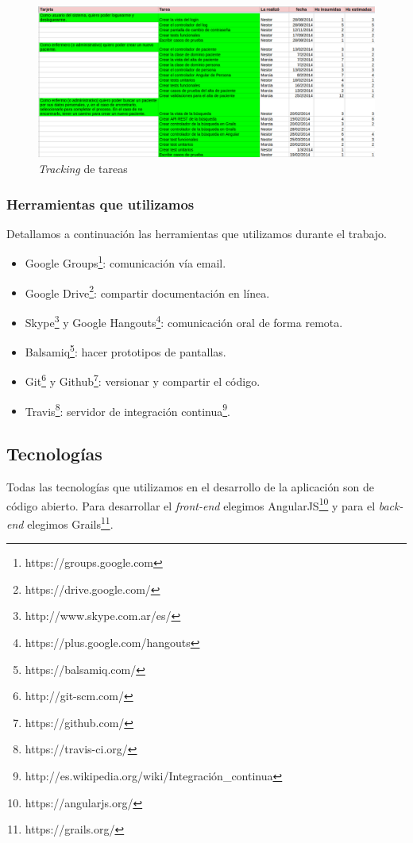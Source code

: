 \begin{figure}[h]
  \centerline{\includegraphics[width=1.2\textwidth]{tracking.png}}
  \caption{\textit{Tracking} de tareas}
  \label{fig:tracking}
\end{figure}

\subsubsection{Herramientas que utilizamos}
Detallamos a continuación las herramientas que utilizamos durante el trabajo.
\begin{itemize}
\item Google Groups\footnote{https://groups.google.com}: comunicación vía email.
\item Google Drive\footnote{https://drive.google.com/}: compartir documentación en línea.
\item Skype\footnote{http://www.skype.com.ar/es/} y Google Hangouts\footnote{https://plus.google.com/hangouts}: comunicación oral de forma remota.
\item Balsamiq\footnote{https://balsamiq.com/}: hacer prototipos de pantallas.
\item Git\footnote{http://git-scm.com/} y Github\footnote{https://github.com/}: versionar y compartir el código.
\item Travis\footnote{https://travis-ci.org/}: servidor de integración continua\footnote{http://es.wikipedia.org/wiki/Integración\_continua}.
\end{itemize}

\subsection{Tecnologías}
Todas las tecnologías que utilizamos en el desarrollo de la aplicación son de código abierto. Para desarrollar el \textit{front-end} elegimos AngularJS\footnote{https://angularjs.org/} y para el \textit{back-end} elegimos Grails\footnote{https://grails.org/}.

